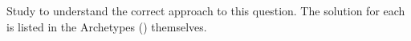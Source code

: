 Study  to understand the correct approach to this question.  The solution for each is listed in the Archetypes () themselves.